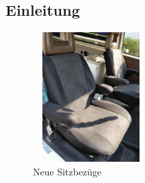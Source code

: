 ﻿%
% 
%



\subsection{Einleitung} 

\begin{figure} 
  \begin{centering}
    \includegraphics[width=0.4\textwidth, height=5cm, keepaspectratio]{../Bilder/Sylt/1.jpg}
    \caption{Neue Sitzbezüge}
  \end{centering}
\end{figure} 

